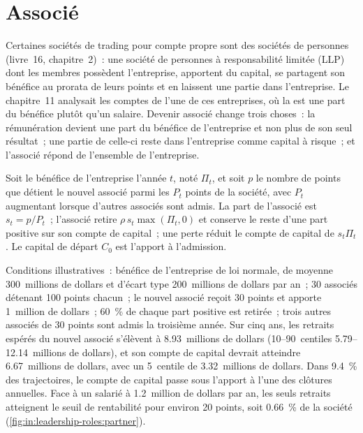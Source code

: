 \section{Associé}

Certaines sociétés de trading pour compte propre sont des sociétés de personnes (livre~16, chapitre~2)~: une société de personnes à responsabilité limitée (LLP) dont les membres possèdent
l'entreprise, apportent du capital, se partagent son bénéfice au prorata de leurs points et en laissent une partie dans l'entreprise. Le chapitre~11 analysait les comptes de l'une de ces entreprises,
où la  est une part du bénéfice plutôt qu'un salaire. Devenir associé change trois choses~:
la rémunération devient une part du bénéfice de l'entreprise et non plus de son seul résultat~;
une partie de celle-ci reste dans l'entreprise comme capital à risque~; et l'associé répond de l'ensemble de l'entreprise.

\begin{method}\label{met:in:leadership-roles:partner}
Soit le bénéfice de l'entreprise l'année $t$, noté $\Pi_t$, et soit $p$ le nombre de points que détient le nouvel associé parmi les $P_t$ points de la société, avec
$P_t$ augmentant lorsque d'autres associés sont admis. La part de l'associé est $s_t=p/P_t$~; l'associé retire $\rho\,s_t\max(\Pi_t,0)$ et
conserve le reste d'une part positive sur son compte de capital~; une perte réduit le compte de capital de $s_t\Pi_t$. Le capital de
départ $C_0$ est l'apport à l'admission.
\end{method}

\begin{example}\label{ex:in:leadership-roles:partner}
Conditions illustratives~: bénéfice de l'entreprise de loi normale, de moyenne 300~millions de dollars et d'écart type 200~millions de dollars par an~; 30 associés
détenant 100 points chacun~; le nouvel associé reçoit 30 points et apporte 1~million de dollars~; 60~\% de chaque part positive est retirée~; trois autres associés
de 30 points sont admis la troisième année. Sur cinq ans, les retraits espérés du nouvel associé s'élèvent à 8.93~millions de dollars (10--90~centiles
5.79--12.14~millions de dollars), et son compte de capital devrait atteindre 6.67~millions de dollars, avec un 5~centile
de 3.32~millions de dollars. Dans 9.4~\% des trajectoires, le compte de capital passe sous l'apport à l'une des clôtures annuelles.
Face à un  salarié à 1.2~million de dollars par an, les seuls retraits atteignent le seuil de rentabilité pour environ 20 points,
soit 0.66~\% de la société (\cref{fig:in:leadership-roles:partner}).
\end{example}

